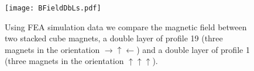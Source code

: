 \begin{figure}[htbp]
\centering
\texttt{[image: BFieldDbLs.pdf]}
\caption{Using FEA simulation data we compare the magnetic field between two stacked cube magnets, a double layer of profile 19 (three magnets in the orientation $\rightarrow\uparrow\leftarrow$) and a double layer of profile 1 (three magnets in the orientation $\uparrow\uparrow\uparrow$).}
\label{fig_BFiledDbLs}
\end{figure}